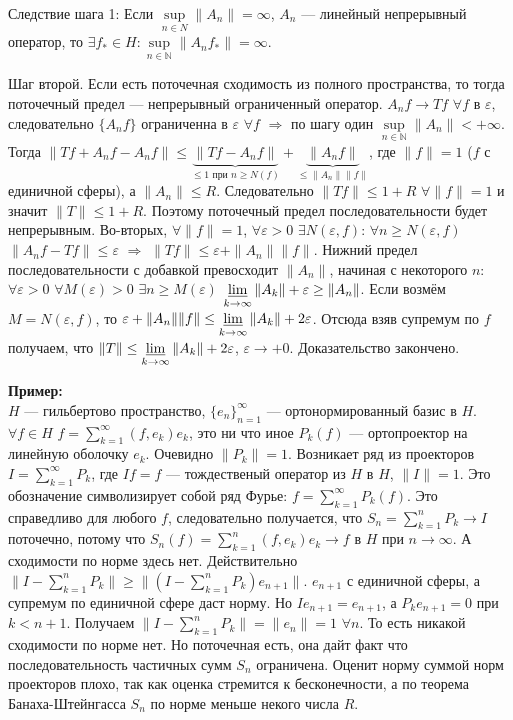 \documentclass[12pt]{article}
\begin{document}
Следствие шага 1: Если $\sup\limits_{n \in N}\|A_n\| = \infty$, $A_n$ --- линейный непрерывный оператор, то $\exists f_* \in H\colon
\sup \limits_{n \in \mathbb N}\|A_n f_*\| = \infty$.

Шаг второй. Если есть поточечная сходимость из полного пространства, то тогда поточечный предел --- непрерывный ограниченный оператор.
$A_n f \to T f$ $\forall f$ в $\varepsilon$, следовательно $\{A_n f\}$ ограниченна в $\varepsilon$ $\forall f$ $\Rightarrow$ по шагу один $\sup \limits_{n \in
\mathbb N}\|A_n\| < +\infty$.
Тогда $\|Tf + A_n f - A_n f\| \le \underbrace{\|Tf - A_n f\|}_{\le 1\text{ при } n \ge N(f)} + \underbrace{\|A_n f\|}_{\le \|A_n\| \|f\|}$, где $\|f\| = 1$ ($f$ с
единичной сферы), а $\|A_n\| \le R$.
Следовательно $\|Tf\| \le 1 + R$ $\forall \|f\| = 1$ и значит $\|T\| \le 1 + R$.
Поэтому поточечный предел последовательности будет непрерывным.
Во-вторых, $\forall \|f\| = 1$, $\forall \varepsilon > 0$ $\exists N(\varepsilon, f)$: $\forall n \ge N(\varepsilon, f)$ $\|A_n f - Tf\| \le \varepsilon$
$\Rightarrow$ $\|Tf\| \le \varepsilon + \|A_n\|\|f\|$.
Нижний предел последовательности с добавкой превосходит $\|A_n\|$, начиная с некоторого $n$:
$\forall \varepsilon > 0$ $\forall M(\varepsilon) > 0$ $\exists n \ge M(\varepsilon)$ $\varliminf\limits_{k \to \infty}\|A_k\| + \varepsilon \ge \|A_n\|$.
Если возмём $M = N(\varepsilon, f)$, то $\varepsilon + \|A_n\| \|f\| \le \varliminf\limits_{k \to \infty}\|A_k\| + 2 \varepsilon$.
Отсюда взяв супремум по $f$ получаем, что $\|T\| \le \varliminf\limits_{k \to \infty}\|A_k\| + 2 \varepsilon$, $\varepsilon \to +0$.
Доказательство закончено.

\textbf{Пример:}\\
$H$ --- гильбертово пространство, $\{e_n\}_{n = 1}^{\infty}$ --- ортонормированный базис в $H$.
$\forall f \in H$ $f = \sum\limits_{k = 1}^{\infty}(f, e_k)e_k$, это ни что иное $P_k(f)$ --- ортопроектор на линейную оболочку $e_k$.
Очевидно $\|P_k\| = 1$.
Возникает ряд из проекторов $I = \sum\limits_{k = 1}^{\infty}P_k$, где $If = f$ --- тождественый оператор из $H$ в $H$, $\|I\| = 1$.
Это обозначение символизирует собой ряд Фурье: $f = \sum\limits_{k = 1}^{\infty}P_k(f)$.
Это справедливо для любого $f$, следовательно получается, что $S_n = \sum\limits_{k = 1}^{n}P_k \to I$ поточечно, потому что
$S_n(f) = \sum\limits_{k = 1}^{n}(f, e_k)e_k \to f$ в $H$ при $n \to \infty$.
А сходимости по норме здесь нет.
Действительно $\|I - \sum\limits_{k = 1}^{n}P_k\| \ge \|(I - \sum\limits_{k = 1}^{n}P_k)e_{n + 1}\|$.
$e_{n+  1}$ с единичной сферы, а супремум по единичной сфере даст норму.
Но $Ie_{n + 1} = e_{n + 1}$, а $P_k e_{n + 1} = 0$ при $k < n + 1$.
Получаем $\|I - \sum\limits_{k = 1}^{n}P_k\| = \|e_n\| = 1$ $\forall n$.
То есть никакой сходимости по норме нет.
Но поточечная есть, она дайт факт что последовательность частичных сумм $S_n$ ограничена.
Оценит норму суммой норм проекторов плохо, так как оценка стремится к бесконечности, а по теорема Банаха-Штейнгасса
$S_n$ по норме меньше некого числа $R$.
\end{document}
